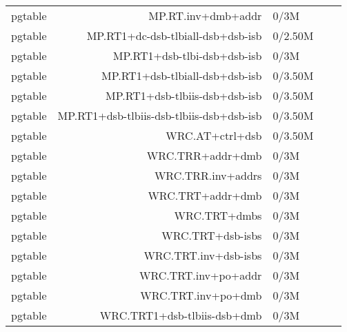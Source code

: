 \begin{tabular}{l r l l l}
   pgtable &MP.RT.inv+dmb+addr & 0/3M & & \\
   pgtable &MP.RT1+dc-dsb-tlbiall-dsb+dsb-isb & 0/2.50M & & \\
   pgtable &MP.RT1+dsb-tlbi-dsb+dsb-isb & 0/3M & & \\
   pgtable &MP.RT1+dsb-tlbiall-dsb+dsb-isb & 0/3.50M & & \\
   pgtable &MP.RT1+dsb-tlbiis-dsb+dsb-isb & 0/3.50M & & \\
   pgtable &MP.RT1+dsb-tlbiis-dsb-tlbiis-dsb+dsb-isb & 0/3.50M & & \\
   pgtable &WRC.AT+ctrl+dsb & 0/3.50M & & \\
   pgtable &WRC.TRR+addr+dmb & 0/3M & & \\
   pgtable &WRC.TRR.inv+addrs & 0/3M & & \\
   pgtable &WRC.TRT+addr+dmb & 0/3M & & \\
   pgtable &WRC.TRT+dmbs & 0/3M & & \\
   pgtable &WRC.TRT+dsb-isbs & 0/3M & & \\
   pgtable &WRC.TRT.inv+dsb-isbs & 0/3M & & \\
   pgtable &WRC.TRT.inv+po+addr & 0/3M & & \\
   pgtable &WRC.TRT.inv+po+dmb & 0/3M & & \\
   pgtable &WRC.TRT1+dsb-tlbiis-dsb+dmb & 0/3M & & \\
\hline
\end{tabular}
